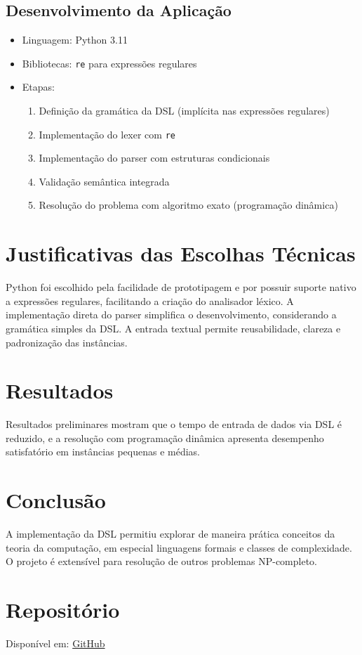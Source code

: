 \documentclass[conference]{IEEEtran}
\begin{document}
\subsection{Desenvolvimento da Aplicação}
\begin{itemize}
    \item Linguagem: Python 3.11
    \item Bibliotecas: \texttt{re} para expressões regulares
    \item Etapas:
    \begin{enumerate}
        \item Definição da gramática da DSL (implícita nas expressões regulares)
        \item Implementação do lexer com \texttt{re}
        \item Implementação do parser com estruturas condicionais
        \item Validação semântica integrada
        \item Resolução do problema com algoritmo exato (programação dinâmica)
    \end{enumerate}
\end{itemize}

\section{Justificativas das Escolhas Técnicas}
Python foi escolhido pela facilidade de prototipagem e por possuir suporte nativo a expressões regulares, facilitando a criação do analisador léxico. A implementação direta do parser simplifica o desenvolvimento, considerando a gramática simples da DSL. A entrada textual permite reusabilidade, clareza e padronização das instâncias.

\section{Resultados}
Resultados preliminares mostram que o tempo de entrada de dados via DSL é reduzido, e a resolução com programação dinâmica apresenta desempenho satisfatório em instâncias pequenas e médias.

\section{Conclusão}
A implementação da DSL permitiu explorar de maneira prática conceitos da teoria da computação, em especial linguagens formais e classes de complexidade. O projeto é extensível para resolução de outros problemas NP-completo.

\section*{Repositório}
Disponível em: \href{https://github.com/Guilherme-del/uniararas/tree/master/python/teoriaCompiladores/n2}{GitHub}



\end{document}
